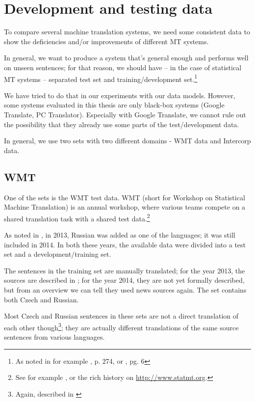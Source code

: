 \section{Development and testing data}

To compare several machine translation systems, we need some consistent data to show the deficiencies and/or improvements of different MT systems.

In general, we want to produce a system that's general enough and performs well on unseen sentences; for that reason, we should have -- in the case of statistical MT systems -- separated test set and training/development set.\footnote{As noted in for example \cite{koehn2010statistical}, p. 274, or \cite{bishop}, pg. 6}

We have tried to do that in our experiments with our data models. However, some systems evaluated in this thesis are only black-box systems (Google Translate, PC Translator). Especially with Google Translate, we cannot rule out the possibility that they already use some parts of the test/development data.


In general, we use two sets with two different domains - WMT data and Intercorp data.

\subsection{WMT}
One of the sets is the WMT test data. 
WMT (short for Workshop on Statistical Machine Translation) is an annual workshop, where various teams compete on a shared translation task with a shared test data.\footnote{See for example \cite{wmt_findings_2013}, or the rich history on \url{http://www.statmt.org}.}

As noted in \cite{wmt_findings_2013}, in 2013, Russian was added as one of the languages; it was still included in 2014. In both these years, the available data were divided into a test set and a development/training set.

The sentences in the training set are manually translated; for the year 2013, the sources are described in \cite{wmt_findings_2013}; for the year 2014, they are not yet formally described, but from an overview we can tell they used news sources again. The set contains both Czech and Russian.


Most Czech and Russian sentences in these sets are not a direct translation of each other though\footnote{Again, described in \cite{wmt_findings_2013}}; they are actually different translations of the same source sentences from various languages. 

